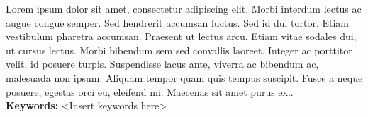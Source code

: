 Lorem ipsum dolor sit amet, consectetur adipiscing elit. Morbi interdum lectus ac augue congue semper. Sed hendrerit accumsan luctus. Sed id dui tortor. Etiam vestibulum pharetra accumsan. Praesent ut lectus arcu. Etiam vitae sodales dui, ut cursus lectus. Morbi bibendum sem sed convallis laoreet. Integer ac porttitor velit, id posuere turpis. Suspendisse lacus ante, viverra ac bibendum ac, malesuada non ipsum. Aliquam tempor quam quis tempus suscipit. Fusce a neque posuere, egestas orci eu, eleifend mi. Maecenas sit amet purus ex..\\

\textbf {Keywords:} <Insert keywords here>